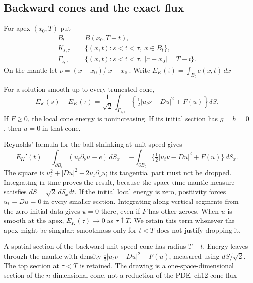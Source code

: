\subsection{Backward cones and the exact flux}
For apex $(x_0,T)$ put
\[
 \begin{aligned}
 B_t&=B(x_0,T-t),\\
 K_{s,\tau}&=\{(x,t):s<t<\tau,\ x\in B_t\},\\
 \Gamma_{s,\tau}&=\{(x,t):s<t<\tau,\ |x-x_0|=T-t\}.
 \end{aligned}
\]
On the mantle let $\nu=(x-x_0)/|x-x_0|$. Write
$E_K(t)=\int_{B_t}e(x,t)\,dx$.
\begin{theorem}
For a solution smooth up to every truncated cone,
\begin{equation}\label{eq:12-cone-flux}
 E_K(s)-E_K(\tau)=\frac1{\sqrt2}\int_{\Gamma_{s,\tau}}
 \left\{\tfrac12|u_t\nu-Du|^2+F(u)\right\}dS.
\end{equation}
If $F\ge0$, the local cone energy is nonincreasing. If its initial
section has $g=h=0$, then $u=0$ in that cone.
\end{theorem}
\begin{expandedproof}
Reynolds' formula for the ball shrinking at unit speed gives
\[
 E_K'(t)=\int_{\partial B_t}(u_t\partial_\nu u-e)\,dS_x
 =-\int_{\partial B_t}\{\tfrac12|u_t\nu-Du|^2+F(u)\}\,dS_x.
\]
The square is $u_t^2+|Du|^2-2u_t\partial_\nu u$; its tangential
part must not be dropped. Integrating in time proves the result,
because the space-time mantle measure satisfies
$dS=\sqrt2\,dS_xdt$. If the initial local energy is zero, positivity
forces $u_t=Du=0$ in every smaller section. Integrating along vertical
segments from the zero initial data gives $u=0$ there, even if $F$
has other zeroes. When $u$ is smooth at the apex, $E_K(\tau)\to0$
as $\tau\uparrow T$. We retain this term whenever the apex might
be singular: smoothness only for $t<T$ does not justify dropping it.
\end{expandedproof}
{A spatial section of the backward unit-speed cone has radius $T-t$.
Energy leaves through the mantle with density
$\frac12|u_t\nu-Du|^2+F(u)$, measured using $dS/\sqrt2$.
The top section at $\tau<T$ is retained. The drawing is a one-space-dimensional
section of the $n$-dimensional cone, not a reduction of the PDE.}
{ch12-cone-flux}

